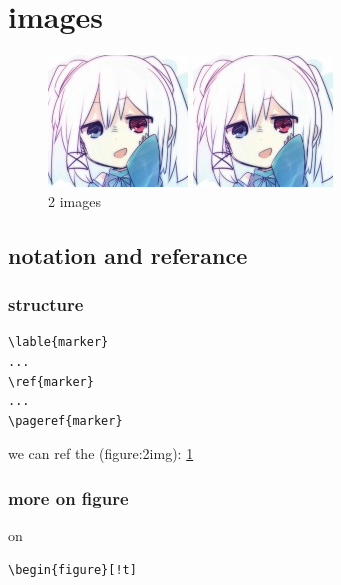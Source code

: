 \documentclass[11pt,a4paper]{article}
\begin{document}
\section{images}{
  \begin{figure}[h!]
    \begin{minipage}[b]{0.45\linewidth}
      \centering
      \includegraphics[natwidth=\linewidth,natheight=0.5\linewidth,scale=1]{head_image.jpg}
    \end{minipage}
    \begin{minipage}[b]{0.45\linewidth}
      \centering
      \includegraphics[natwidth=\linewidth,natheight=0.5\linewidth,scale=1]{head_image.jpg}
    \end{minipage}
    \label{fig:2img}
    \caption{2 images}
  \end{figure}

  \subsection{notation and referance}{
    \subsubsection{structure}{
\begin{verbatim}
\lable{marker}
...
\ref{marker}
...
\pageref{marker}
\end{verbatim}

we can ref the (figure:2img): \ref{fig:2img}
    }

    \subsubsection{more on figure}{
      on
\begin{verbatim}
\begin{figure}[!t]
\end{verbatim}

}}}
\end{document}

